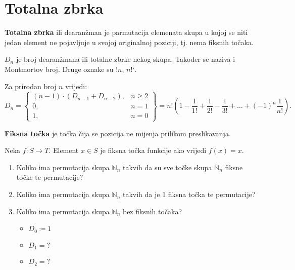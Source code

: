 \section{Totalna zbrka}

\textbf{Totalna zbrka} ili dearanžman je parmutacija elemenata skupa u kojoj se
niti jedan element ne pojavljuje u svojoj originalnoj poziciji, tj. nema fiksnih
točaka.

\bigskip
\noindent
$D_n$ je broj dearanžmana ili totalne zbrke nekog skupa. Također se naziva i Montmortov broj. Druge oznake su $!n$, $n\text{!`}$.

\begin{theorem}
    Za prirodan broj $n$ vrijedi:
    $$
        D_n = \begin{Bmatrix}
            (n-1) \cdot (D_{n - 1} + D_{n - 2}),&n \geq 2\\
            0,&n = 1\\
            1,&n = 0
        \end{Bmatrix} = n! \left(1-\frac{1}{1!} + \frac{1}{2!} - \frac{1}{3!} + \dots + (-1)^n \frac{1}{n!}\right).
    $$
\end{theorem}

\textbf{Fiksna točka} je točka čija se pozicija ne mijenja prilikom preslikavanja.

\begin{example}
    Neka $f:S\to T$. Element $x\in S$ je fiksna točka funkcije ako vrijedi $f(x)
    = x$.

    \begin{enumerate}
        \item Koliko ima permutacija skupa $\mathbb{N}_n$ takvih da su sve točke
        skupa $\mathbb{N}_n$ fiksne točke te permutacije?
        \item Koliko ima permutacija skupa $\mathbb{N}_n$ takvih da je 1 fiksna
        točka te permutacije?
        \item Koliko ima permutacija skupa $\mathbb{N}_n$ bez fiksnih točaka?
        \begin{itemize}
            \item $D_0 \coloneq 1$
            \item $D_1 = ?$
            \item $D_2 = ?$
        \end{itemize}
    \end{enumerate}
\end{example}

